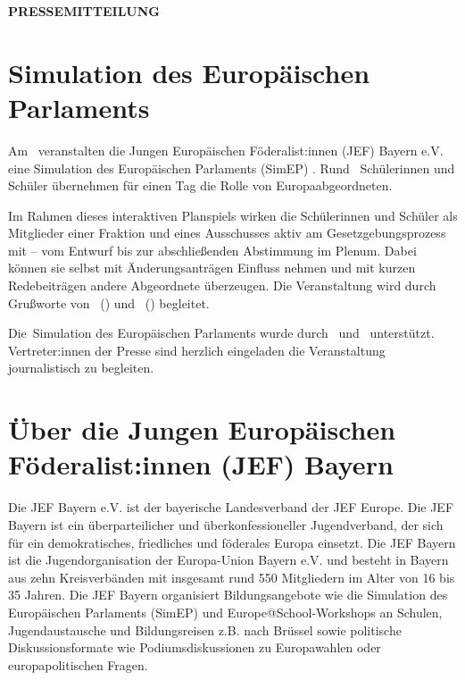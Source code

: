 \documentclass[11pt]{article}
\begin{document}
\thispagestyle{empty}

\begin{center}
    \textbf{\Large PRESSEMITTEILUNG}
\end{center}

\vspace{0.5cm}

\section*{Simulation des Europäischen Parlaments \location}

Am \datum\ veranstalten die Jungen Europäischen Föderalist:innen (JEF) Bayern e.V. eine Simulation des Europäischen Parlaments (SimEP) \location. Rund \numSuS\ Schülerinnen und Schüler übernehmen für einen Tag die Rolle von Europaabgeordneten.

Im Rahmen dieses interaktiven Planspiels wirken die Schülerinnen und Schüler als Mitglieder einer Fraktion und eines Ausschusses aktiv am Gesetzgebungsprozess mit -- vom Entwurf bis zur abschließenden Abstimmung im Plenum. Dabei können sie selbst mit Änderungsanträgen Einfluss nehmen und mit kurzen Redebeiträgen andere Abgeordnete überzeugen. Die Veranstaltung wird durch Grußworte von \stadtvertreter\ (\stadtvertreterOffice) und \politiker\ (\politikerOffice) begleitet.

Die~Simulation des Europäischen Parlaments wurde durch \sponsor\ und \localSupport\ unterstützt. Vertreter:innen der Presse sind herzlich eingeladen die Veranstaltung journalistisch zu begleiten.

\section*{Über die Jungen Europäischen Föderalist:innen (JEF) Bayern}

Die JEF Bayern e.V. ist der bayerische Landesverband der JEF Europe. Die JEF Bayern ist ein überparteilicher und überkonfessioneller Jugendverband, der sich für ein demokratisches, friedliches und föderales Europa einsetzt. Die JEF Bayern ist die Jugendorganisation der Europa-Union Bayern e.V. und besteht in Bayern aus zehn Kreisverbänden mit insgesamt rund 550 Mitgliedern im Alter von 16 bis 35 Jahren. Die JEF Bayern organisiert Bildungsangebote wie die Simulation des Europäischen Parlaments (SimEP) und Europe@School-Workshops an Schulen, Jugendaustausche und Bildungsreisen z.B. nach Brüssel sowie politische Diskussionsformate wie Podiumsdiskussionen zu Europawahlen oder europapolitischen Fragen.
\end{document}
